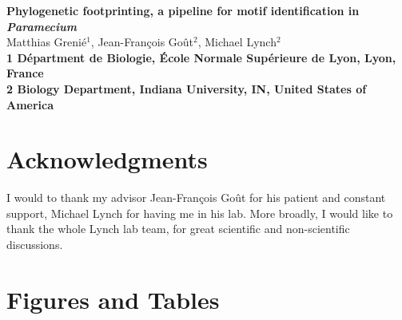 \documentclass[10pt]{article}
\date{}
\begin{document}
\begin{flushleft}
{\Large
\textbf{Phylogenetic footprinting, a pipeline for motif identification in \textit{Paramecium}}
}
\\
Matthias Grenié$^{1}$, 
Jean-François Goût$^{2}$, 
Michael Lynch$^{2}$
\\
\bf{1} Départment de Biologie, École Normale Supérieure de Lyon, Lyon, France
\\
\bf{2} Biology Department, Indiana University, IN, United States of America
\\
\end{flushleft}











\section*{Acknowledgments}

I would to thank my advisor Jean-François Goût for his patient and constant support, Michael Lynch for having me in his lab. More broadly, I would like to thank the whole Lynch lab team, for great scientific and non-scientific discussions.

\section*{Figures and Tables}
\end{document}
